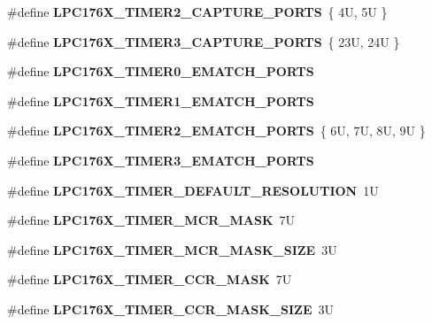\begin{DoxyCompactItemize}
\#define {\bfseries L\+P\+C176\+X\+\_\+\+T\+I\+M\+E\+R2\+\_\+\+C\+A\+P\+T\+U\+R\+E\+\_\+\+P\+O\+R\+TS}~\{ 4\+U, 5\+U \}
\item 
\mbox{\label{timer-defs_8h_a12c9306356276b8a6076b51c0b65a18d}} 
\#define {\bfseries L\+P\+C176\+X\+\_\+\+T\+I\+M\+E\+R3\+\_\+\+C\+A\+P\+T\+U\+R\+E\+\_\+\+P\+O\+R\+TS}~\{ 23\+U, 24\+U \}
\item 
\#define {\bfseries L\+P\+C176\+X\+\_\+\+T\+I\+M\+E\+R0\+\_\+\+E\+M\+A\+T\+C\+H\+\_\+\+P\+O\+R\+TS}
\item 
\#define {\bfseries L\+P\+C176\+X\+\_\+\+T\+I\+M\+E\+R1\+\_\+\+E\+M\+A\+T\+C\+H\+\_\+\+P\+O\+R\+TS}
\item 
\mbox{\label{timer-defs_8h_a166d0cf7efea7cbf885a714365e47fa9}} 
\#define {\bfseries L\+P\+C176\+X\+\_\+\+T\+I\+M\+E\+R2\+\_\+\+E\+M\+A\+T\+C\+H\+\_\+\+P\+O\+R\+TS}~\{ 6\+U, 7\+U, 8\+U, 9\+U \}
\item 
\#define {\bfseries L\+P\+C176\+X\+\_\+\+T\+I\+M\+E\+R3\+\_\+\+E\+M\+A\+T\+C\+H\+\_\+\+P\+O\+R\+TS}
\item 
\mbox{\label{timer-defs_8h_a10c7fc1120195feb2daf0a8a768ea2fb}} 
\#define {\bfseries L\+P\+C176\+X\+\_\+\+T\+I\+M\+E\+R\+\_\+\+D\+E\+F\+A\+U\+L\+T\+\_\+\+R\+E\+S\+O\+L\+U\+T\+I\+ON}~1U
\item 
\mbox{\label{timer-defs_8h_aa0ae226f0870c6ba6f665124188c805f}} 
\#define {\bfseries L\+P\+C176\+X\+\_\+\+T\+I\+M\+E\+R\+\_\+\+M\+C\+R\+\_\+\+M\+A\+SK}~7U
\item 
\mbox{\label{timer-defs_8h_ad8550db912b9334928ac80222b893989}} 
\#define {\bfseries L\+P\+C176\+X\+\_\+\+T\+I\+M\+E\+R\+\_\+\+M\+C\+R\+\_\+\+M\+A\+S\+K\+\_\+\+S\+I\+ZE}~3U
\item 
\mbox{\label{timer-defs_8h_aa76b49f6c8aec19826945302cce3ee9e}} 
\#define {\bfseries L\+P\+C176\+X\+\_\+\+T\+I\+M\+E\+R\+\_\+\+C\+C\+R\+\_\+\+M\+A\+SK}~7U
\item 
\mbox{\label{timer-defs_8h_af5ea204aeb7ba74b9560985fcd8c287c}} 
\#define {\bfseries L\+P\+C176\+X\+\_\+\+T\+I\+M\+E\+R\+\_\+\+C\+C\+R\+\_\+\+M\+A\+S\+K\+\_\+\+S\+I\+ZE}~3U
\item 
\mbox{\label{timer-defs_8h_a6ef56d1a56adf59be0683ed80c81b603}} 

\end{DoxyCompactItemize}

